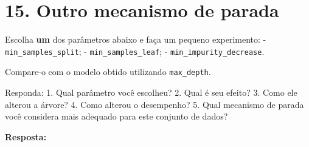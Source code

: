 \documentclass[11pt]{article}
\begin{document}
    \section{15. Outro mecanismo de parada}\label{outro-mecanismo-de-parada}

Escolha \textbf{um} dos parâmetros abaixo e faça um pequeno experimento:
- \texttt{min\_samples\_split}; - \texttt{min\_samples\_leaf}; -
\texttt{min\_impurity\_decrease}.

Compare-o com o modelo obtido utilizando \texttt{max\_depth}.

Responda: 1. Qual parâmetro você escolheu? 2. Qual é seu efeito? 3. Como
ele alterou a árvore? 4. Como alterou o desempenho? 5. Qual mecanismo de
parada você considera mais adequado para este conjunto de dados?

\textbf{Resposta:}
\end{document}
